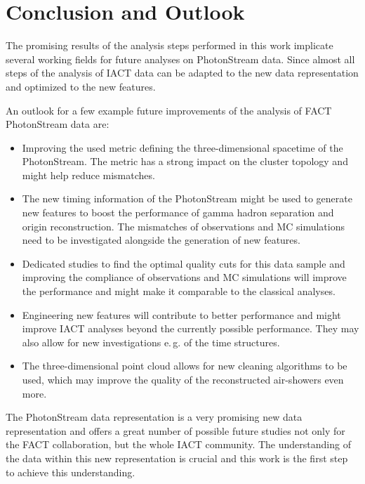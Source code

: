 \chapter{Conclusion and Outlook}
%
The promising results of the analysis steps performed in this work implicate
several working fields for future analyses on PhotonStream data. Since almost
all steps of the analysis of IACT data can be adapted to the new data
representation and optimized to the new features.

An outlook for a few example future improvements of the analysis of FACT
PhotonStream data are:

\begin{itemize}
  \item Improving the used metric defining the three-dimensional spacetime of the PhotonStream. The metric has a strong impact on the cluster topology and might help reduce mismatches.
  \item The new timing information of the PhotonStream might be used to generate new features to boost the performance of gamma hadron separation and origin reconstruction. The mismatches of observations and MC simulations need to be investigated alongside the generation of new features.
  \item Dedicated studies to find the optimal quality cuts for this data sample and improving the compliance of observations and MC simulations will improve the performance and might make it comparable to the classical analyses.
  \item Engineering new features will contribute to better performance and might improve IACT analyses beyond the currently possible performance. They may also allow for new investigations e.\,g. of the time structures.
  \item The three-dimensional point cloud allows for new cleaning algorithms to be used, which may improve the quality of the reconstructed air-showers even more.
\end{itemize}

The PhotonStream data representation is a very promising new data
representation and offers a great number of possible future studies not only for the FACT collaboration, but the whole IACT community. The 
understanding of the data within this new representation is crucial and this
work is the first step to achieve this understanding.
